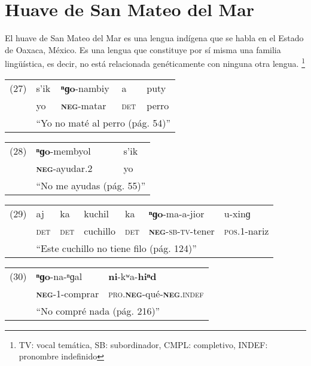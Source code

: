 \section*{Huave de San Mateo del Mar}

\noindent El huave de San Mateo del Mar es una lengua indígena que se habla en el Estado de Oaxaca, México. Es una lengua que constituye por sí misma una familia lingüística, es decir, no está relacionada genéticamente con ninguna otra lengua.
\footnote{TV: vocal temática, SB: subordinador, CMPL: completivo, INDEF: pronombre indefinido}
\vspace{0.5cm}

{\setmainfont{Charis SIL}

\begin{tabular}{lllll}
 (27) & s'ik & \textbf{ⁿɡo}-nambiy & a & puty\\
& yo & \textsc{\textbf{neg}}-matar & \textsc{det} & perro \\
& \multicolumn{4}{l}{``Yo no maté al perro (pág. 54)''}
\end{tabular}\vspace{0.5cm}

\begin{tabular}{lll}
(28) & \textbf{ⁿɡo}-membyol & s'ik \\
& \textsc{\textbf{neg}}-ayudar.2 & yo \\
& \multicolumn{2}{l}{``No me ayudas (pág. 55)''} \\
\end{tabular} \vspace{0.5cm}

\begin{tabular}{lllllll}
(29) & aj & ka & kuchil & ka & \textbf{ⁿɡo}-ma-a-jior & u-xinɡ \\
& \textsc{det} & \textsc{det} & cuchillo & \textsc{det} & \textsc{\textbf{neg}-sb-tv}-tener & \textsc{pos.1}-nariz \\
& \multicolumn{6}{l}{``Este cuchillo no tiene filo (pág. 124)''} \\
\end{tabular} \vspace{0.5cm}

\begin{tabular}{lll}
(30) & \textbf{ⁿɡo}-na-ⁿɡal & \textbf{ni}-kʷa-\textbf{hiⁿd} \\
& \textsc{\textbf{neg}}-1-comprar & \textsc{pro.\textbf{neg}}-qué-\textsc{\textbf{neg}.indef} \\
& \multicolumn{2}{l}{``No compré nada (pág. 216)''} \\
\end{tabular} \vspace{0.5cm}

}
